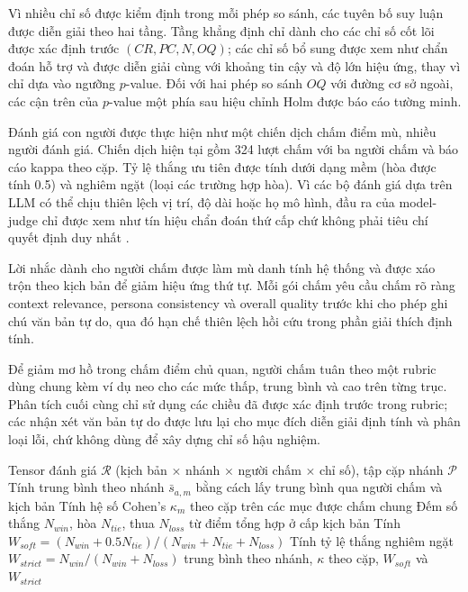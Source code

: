 ﻿\documentclass[a4paper,12pt]{article}
\begin{document}
Vì nhiều chỉ số được kiểm định trong mỗi phép so sánh, các tuyên bố suy luận được diễn giải theo hai tầng. Tầng khẳng định chỉ dành cho các chỉ số cốt lõi được xác định trước \((CR,PC,N,OQ)\); các chỉ số bổ sung được xem như chẩn đoán hỗ trợ và được diễn giải cùng với khoảng tin cậy và độ lớn hiệu ứng, thay vì chỉ dựa vào ngưỡng \(p\)-value. Đối với hai phép so sánh \(OQ\) với đường cơ sở ngoài, các cận trên của \(p\)-value một phía sau hiệu chỉnh Holm được báo cáo tường minh.

Đánh giá con người được thực hiện như một chiến dịch chấm điểm mù, nhiều người đánh giá. Chiến dịch hiện tại gồm 324 lượt chấm với ba người chấm và báo cáo kappa theo cặp. Tỷ lệ thắng ưu tiên được tính dưới dạng mềm (hòa được tính 0.5) và nghiêm ngặt (loại các trường hợp hòa). Vì các bộ đánh giá dựa trên LLM có thể chịu thiên lệch vị trí, độ dài hoặc họ mô hình, đầu ra của model-judge chỉ được xem như tín hiệu chẩn đoán thứ cấp chứ không phải tiêu chí quyết định duy nhất \cite{Liu2023GEval}.

Lời nhắc dành cho người chấm được làm mù danh tính hệ thống và được xáo trộn theo kịch bản để giảm hiệu ứng thứ tự. Mỗi gói chấm yêu cầu chấm rõ ràng context relevance, persona consistency và overall quality trước khi cho phép ghi chú văn bản tự do, qua đó hạn chế thiên lệch hồi cứu trong phần giải thích định tính.

Để giảm mơ hồ trong chấm điểm chủ quan, người chấm tuân theo một rubric dùng chung kèm ví dụ neo cho các mức thấp, trung bình và cao trên từng trục. Phân tích cuối cùng chỉ sử dụng các chiều đã được xác định trước trong rubric; các nhận xét văn bản tự do được lưu lại cho mục đích diễn giải định tính và phân loại lỗi, chứ không dùng để xây dựng chỉ số hậu nghiệm.

\begin{algorithm}[H]
\caption{Tổng hợp điểm chấm của con người và tính độ đồng thuận}
\begin{algorithmic}[1]
\Require Tensor đánh giá \(\mathcal{R}\) (kịch bản \(\times\) nhánh \(\times\) người chấm \(\times\) chỉ số), tập cặp nhánh \(\mathcal{P}\)
  \State Tính trung bình theo nhánh \(\bar{s}_{a,m}\) bằng cách lấy trung bình qua người chấm và kịch bản
  \State Tính hệ số Cohen's \(\kappa_m\) theo cặp trên các mục được chấm chung
\EndFor
{}
  \State Đếm số thắng \(N_{win}\), hòa \(N_{tie}\), thua \(N_{loss}\) từ điểm tổng hợp ở cấp kịch bản
  \State Tính \(W_{soft}=(N_{win}+0.5N_{tie})/(N_{win}+N_{tie}+N_{loss})\)
  \State Tính tỷ lệ thắng nghiêm ngặt \(W_{strict}=N_{win}/(N_{win}+N_{loss})\)
\EndFor
\State \Return trung bình theo nhánh, \(\kappa\) theo cặp, \(W_{soft}\) và \(W_{strict}\)
\end{algorithmic}
\end{algorithm}
\end{document}
